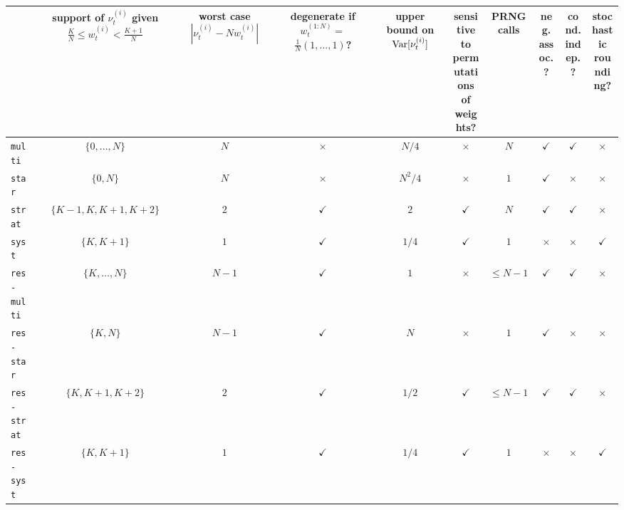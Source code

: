 \begin{landscape}
\begin{table}[ht]
\centering
\begin{tabular}{ l | c c c c c c c c c }
\hline\hline
& \thead{support of $\nu_t^{(i)}$ given
            \\ $ \frac{K}{N} \leq w_t^{(i)} < \frac{K+1}{N}$} 
        & \thead{worst case\\ $|\nu_t^{(i)} - Nw_t^{(i)}|$}
        & \thead{degenerate if\\ $w_t^{(1:N)} =$\\ $\frac{1}{N}(1,\dots,1)$?} 
        & \thead{upper\\ bound on \\ $\operatorname{Var}[\nu_t^{(i)}]$}
        & \thead{sensitive to\\ permutations\\ of weights?} 
        & \thead{PRNG\\ calls}
        & \thead{neg.\\ assoc.?}
        & \thead{cond.\\ indep.?} 
        & \thead{stochastic\\ rounding?}  \\
\hline
\texttt{multi} & $\{0,\dots,N\}$ & $N$ & $\times$ & $N/4$ 
        & $\times$ & $N$ & $\checkmark$ & $\checkmark$ & $\times$ \\
\texttt{star} & $\{0, N\}$ & $N$ & $\times$ & $N^2/4$ 
        & $\times$ & $1$ & $\checkmark$ & $\times$ & $\times$ \\
\texttt{strat} & $\{K-1, K, K+1, K+2\}$ & $2$ & $\checkmark$ & $2$ 
        & $\checkmark$ & $N$ & $\checkmark$ & $\checkmark$ & $\times$ \\
\texttt{syst} & $\{K, K+1\}$ & $1$ & $\checkmark$ & $1/4$ 
        & $\checkmark$ & $1$ & $\times$ & $\times$ & $\checkmark$ \\
\texttt{res-multi} & $\{K,\dots,N\}$ & $N-1$ & $\checkmark$  & $1$
        & $\times$ & $\leq N-1$ & $\checkmark$ & $\checkmark$ & $\times$ \\
\texttt{res-star} & $\{K, N\}$ & $N-1$ & $\checkmark$  & $N$
        & $\times$ & $1$ & $\checkmark$ & $\times$ & $\times$ \\
\texttt{res-strat} & $\{K, K+1, K+2\}$ & $2$ & $\checkmark$  & $1/2$
        & $\checkmark$ & $\leq N-1$ & $\checkmark$ & $\checkmark$ & $\times$ \\
\texttt{res-syst} & $\{K, K+1\}$ & $1$ & $\checkmark$ & $1/4$ 
        & $\checkmark$ & $1$ & $\times$ & $\times$ & $\checkmark$ \\

\end{tabular}
\end{table}
\end{landscape}
